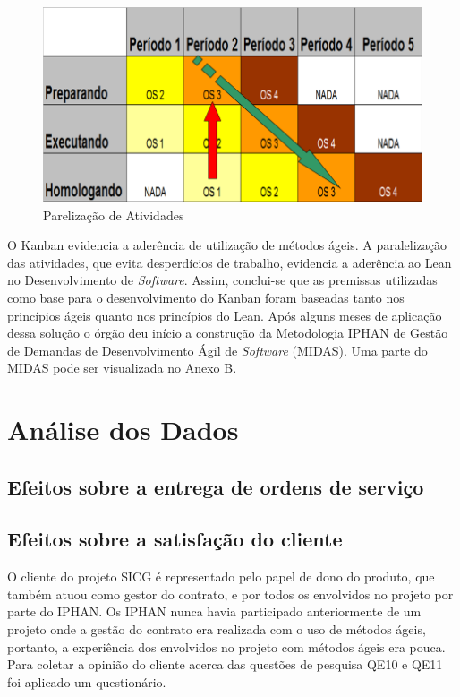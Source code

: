 \begin{figure}[H]
		\centering
		\label{fig09}
			\includegraphics[scale=0.5]{figuras/kanbanIPHAN5.png}
		\caption{Parelização de Atividades \cite{parente}}
\end{figure}

O Kanban evidencia a aderência de utilização de métodos ágeis. A paralelização das atividades, que evita desperdícios de trabalho, evidencia a aderência ao Lean no Desenvolvimento de \textit{Software}. Assim, conclui-se que as premissas utilizadas como base para o desenvolvimento do Kanban foram baseadas tanto nos princípios ágeis quanto nos princípios do Lean. Após alguns meses de aplicação dessa solução o órgão deu início a construção da Metodologia IPHAN de Gestão de Demandas de Desenvolvimento Ágil de \textit{Software} (MIDAS). Uma parte do MIDAS pode ser visualizada no Anexo B. 



\section[Análise dos Dados]{Análise dos Dados}

\subsection[Efeitos sobre a entrega de ordens de serviço]{Efeitos sobre a entrega de ordens de serviço}

\subsection[Efeitos sobre a satisfação do cliente]{Efeitos sobre a satisfação do cliente}

O cliente do projeto SICG é representado pelo papel de dono do produto, que também atuou como gestor do contrato, e por todos os envolvidos no projeto por parte do IPHAN. Os IPHAN nunca havia participado anteriormente de um projeto onde a gestão do contrato era realizada com o uso de métodos ágeis, portanto, a experiência dos envolvidos no projeto com métodos ágeis era pouca. Para coletar a opinião do cliente acerca das questões de pesquisa QE10  e QE11 foi aplicado um questionário.


